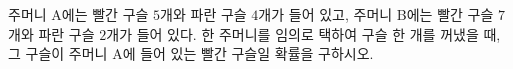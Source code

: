 주머니 A에는 빨간 구슬 $5$개와 파란 구슬 $4$개가 들어 있고, 주머니 B에는 빨간 구슬 $7$개와 파란 구슬 $2$개가 들어 있다. 한 주머니를 임의로 택하여 구슬 한 개를 꺼냈을 때, 그 구슬이 주머니 A에 들어 있는 빨간 구슬일 확률을 구하시오.
